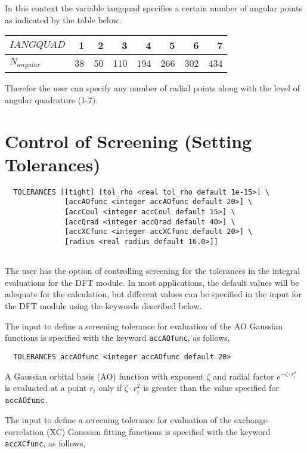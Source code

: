 In this context the variable iangquad specifies a certain number of
angular points as indicated by the table below.


  \begin{tabular}[right]{|l|r r r r r r r|} \hline
$IANGQUAD$ & 1 & 2 & 3 & 4 & 5 & 6 & 7 \\ \hline
$N_{angular}$ & 38 & 50 & 110 & 194 & 266 & 302 & 434 \\  \hline
  \end{tabular}

Therefor the user can specify any number of radial points along with
the level of angular quadrature (1-7).

\section{Control of Screening (Setting Tolerances)}
\begin{verbatim}
  TOLERANCES [[tight] [tol_rho <real tol_rho default 1e-15>] \
              [accAOfunc <integer accAOfunc default 20>] \
              [accCoul <integer accCoul default 15>] \
              [accQrad <integer accQrad default 40>] \
              [accXCfunc <integer accXCfunc default 20>] \
              [radius <real radius default 16.0>]]


\end{verbatim}


The user has the option of controlling screening for the tolerances in
the integral evaluations for the DFT module.  In most applications, the
default values will be adequate for the calculation, but different values
can be specified in the input for the DFT module using the keywords
described below.

The input to define a screening tolerance for evaluation of the AO 
Gaussian functions is specified with the keyword \verb+accAOfunc+, as
follows,

\begin{verbatim}
  TOLERANCES accAOfunc <integer accAOfunc default 20>
\end{verbatim}

A Gaussian orbital basis (AO) function with exponent $\zeta$
and radial factor $e^{-\zeta\cdot r_i^2}$ is 
evaluated  at a point $r_i$ only if 
$\zeta\cdot r_i^2$ is greater than the value specified for ${\tt accAOfunc}$.

The input to define a screening tolerance for evaluation of the exchange-
correlation (XC) Gaussian fitting functions is specified with the
keyword \verb+accXCfunc+, as follows,
 

